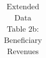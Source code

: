 \begin{longtable}{llcccccccccc}
\caption{Extended Data Table 2b: Beneficiary Revenues} \label{tab:pap__b2_setben} \\                                                                                                                                                                                                                                                                                                                                                                                                                                                                                                                                                                                                                                                                                                                                                                                                                              
\hline \hline                                                                                                                                                                                                                                                                                                                                                                                                                                                                                                                                                                                                                                                                                                                                                                                                                                                                                                     

\end{longtable}
